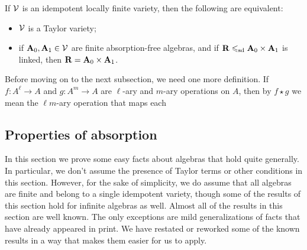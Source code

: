 \begin{theorem}
\label{thm:absorption}
If $\mathcal{V}$ is an idempotent locally finite variety, then the following are equivalent:
\begin{itemize}
\item $\mathcal{V}$ is a Taylor variety;
\item if $\mathbf{A}_0, \mathbf{A}_1 \in \mathcal{V}$ are finite absorption-free algebras, 
  and if $\mathbf{R} \leqslant_{\mathrm{sd}} \mathbf{A}_0 \times \mathbf{A}_1$ is linked, then $\mathbf{R} = \mathbf{A}_0 \times \mathbf{A}_1$.
\end{itemize}
\end{theorem}

Before moving on to the next subsection, we need one more definition.  
If $f\colon A^\ell\to A$ and 
$g\colon A^m\to A$ are 
$\ell$-ary and $m$-ary operations on $A$,
then by $f \star g$ we mean the $\ell m$-ary operation 
that maps each 





\subsection{Properties of absorption}
In this section we prove some easy facts about algebras that hold
quite generally.  In particular, we don't assume the presence of Taylor terms or
other \malcev conditions in this section.  However, for the sake of
simplicity, we do assume that all algebras are finite and belong to a single
idempotent variety, though some of the results of this section hold for
infinite algebras as well.  
Almost all of the results in this section are well known.
The only exceptions are mild generalizations of facts that have already appeared in print.
We have restated or reworked some of the known results in a way that makes them easier
for us to apply. 

